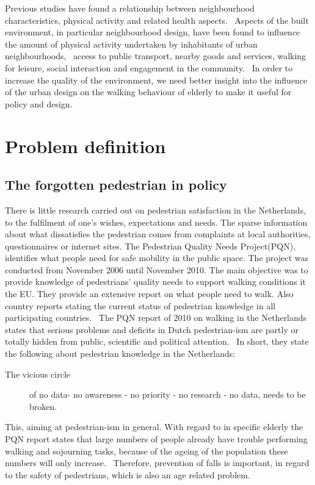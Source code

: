 Previous studies have found a relationship between neighbourhood characteristics, physical activity and related health aspects.~\cite{Borst2008} Aspects of the built environment, in particular neighbourhood design, have been found to influence the amount of physical activity undertaken by inhabitants of urban neighbourhoods,~\cite{Borst2008} access to public transport, nearby goods and services, walking for leisure, social interaction and engagement in the community.~\cite{Vine2012} In order to increase the quality of the environment, we need better insight into the influence of the urban design on the walking behaviour of elderly to make it useful for policy and design. 

\section{Problem definition}
\subsection{The forgotten pedestrian in policy}
There is little research carried out on pedestrian satisfaction in the Netherlands, to the fulfilment of one's wishes, expectations and needs. The sparse information about what dissatisfies the pedestrian comes from complaints at local authorities, questionnaires or internet sites. The Pedestrian Quality Needs Project(PQN), identifies what people need for safe mobility in the public space. The project was conducted from November 2006 until November 2010. The main objective was to provide knowledge of pedestrians' quality needs to support walking conditions it the EU. They provide an extensive report on what people need to walk. Also country reports stating the current status of pedestrian knowledge in all participating countries.~\cite{Sauter2010} The PQN report of 2010 on walking in the Netherlands states that serious problems and deficits in Dutch pedestrian-ism are partly or totally hidden from public, scientific and political attention.~\cite{countryReport} In short, they state the following about pedestrian knowledge in the Netherlands: 

\begin{description}
\item[The vicious circle] of no data- no awareness - no priority - no research - no data, needs to be broken.~\cite{Sauter2010, countryReport}
\end{description} 

This, aiming at pedestrian-ism in general. With regard to in specific elderly the PQN report states that large numbers of people already have trouble performing walking and sojourning tasks, because of the ageing of the population these numbers will only increase.~\cite{Sauter2010} Therefore, prevention of falls is important, in regard to the safety of pedestrians, which is also an age related problem.~\cite{Sauter2010}

